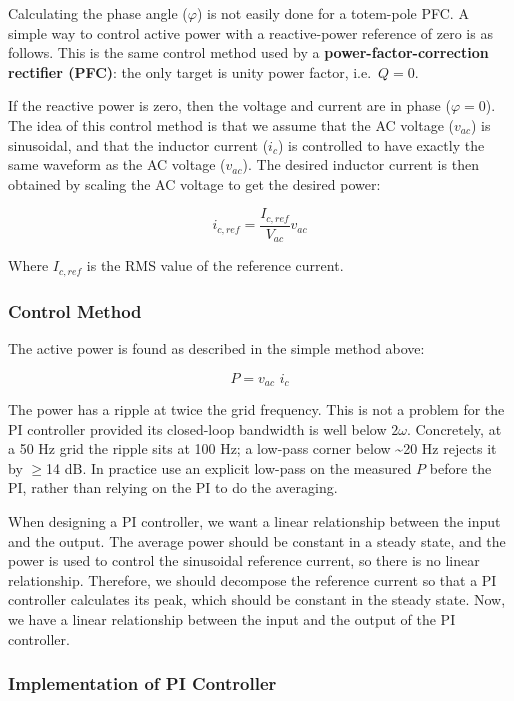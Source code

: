 \documentclass[11pt]{article}
\begin{document}
    Calculating the phase angle (\(\varphi\)) is not easily done for a
totem-pole PFC. A simple way to control active power with a
reactive-power reference of zero is as follows. This is the same control
method used by a \textbf{power-factor-correction rectifier (PFC)}: the
only target is unity power factor, i.e.~\(Q = 0\).

If the reactive power is zero, then the voltage and current are in phase
(\(\varphi = 0\)). The idea of this control method is that we assume
that the AC voltage (\(v_{ac}\)) is sinusoidal, and that the inductor
current (\(i_c\)) is controlled to have exactly the same waveform as the
AC voltage (\(v_{ac}\)). The desired inductor current is then obtained
by scaling the AC voltage to get the desired power:

\[
    i_{c,ref} = \frac{I_{c,ref}}{V_{ac}} v_{ac}
\]

Where \(I_{c,ref}\) is the RMS value of the reference current.

    \hypertarget{control-method}{%
\subsubsection{Control Method}\label{control-method}}

    The active power is found as described in the simple method above:

\[
    P = v_{ac} \, \, i_c
\]

The power has a ripple at twice the grid frequency. This is not a
problem for the PI controller provided its closed-loop bandwidth is well
below \(2\omega\). Concretely, at a 50 Hz grid the ripple sits at 100
Hz; a low-pass corner below \textasciitilde20 Hz rejects it by $\geq$14 dB.
In practice use an explicit low-pass on the measured \(P\) before the
PI, rather than relying on the PI to do the averaging.

When designing a PI controller, we want a linear relationship between
the input and the output. The average power should be constant in a
steady state, and the power is used to control the sinusoidal reference
current, so there is no linear relationship. Therefore, we should
decompose the reference current so that a PI controller calculates its
peak, which should be constant in the steady state. Now, we have a
linear relationship between the input and the output of the PI
controller.

    \hypertarget{implementation-of-pi-controller-2}{%
\subsubsection{Implementation of PI
Controller}\label{implementation-of-pi-controller-2}}
\end{document}
